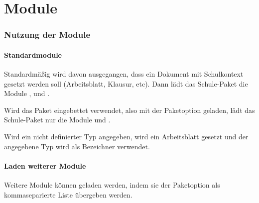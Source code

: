 \part{Module}
    \label{sec:module}
    \section{Nutzung der Module}
        \subsection{Standardmodule}
        Standardmäßig wird davon ausgegangen, dass ein Dokument mit Schulkontext gesetzt werden soll (Arbeitsblatt, Klausur, etc). Dann lädt das Schule-Paket die Module ,  und .

        Wird das Paket eingebettet verwendet, also mit der Paketoption  geladen, lädt das Schule-Paket nur die Module  und .

        Wird ein nicht definierter Typ angegeben, wird ein Arbeitsblatt gesetzt und der angegebene Typ wird als Bezeichner verwendet.

        \subsection{Laden weiterer Module}
        \begin{options}
            \Default Weitere Module können geladen werden, indem sie der Paketoption  als kommaseparierte Liste übergeben werden.
        \end{options}

    
    
    
    
    
    
    
    
    
    